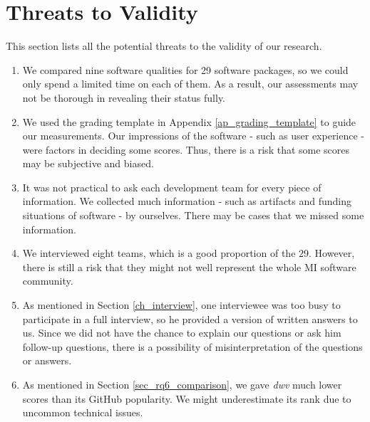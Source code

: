 \section{Threats to Validity}
\label{sec_threats_to_validity}
This section lists all the potential threats to the validity of our research.

\begin{enumerate}
\item We compared nine software qualities for 29 software packages, so we could only spend a limited time on each of them. As a result, our assessments may not be thorough in revealing their status fully.
\item We used the grading template in Appendix \ref{ap_grading_template} to guide our measurements. Our impressions of the software - such as user experience - were factors in deciding some scores. Thus, there is a risk that some scores may be subjective and biased.
\item It was not practical to ask each development team for every piece of information. We collected much information - such as artifacts and funding situations of software - by ourselves. There may be cases that we missed some information.
\item We interviewed eight teams, which is a good proportion of the 29. However, there is still a risk that they might not well represent the whole MI software community.
\item As mentioned in Section \ref{ch_interview}, one interviewee was too busy to participate in a full interview, so he provided a version of written answers to us. Since we did not have the chance to explain our questions or ask him follow-up questions, there is a possibility of misinterpretation of the questions or answers.
\item As mentioned in Section \ref{sec_rq6_comparison}, we gave \textit{dwv} much lower scores than its GitHub popularity. We might underestimate its rank due to uncommon technical issues.
\end{enumerate}
